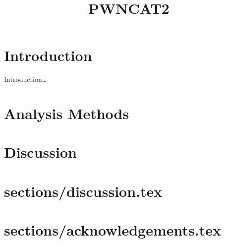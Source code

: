 \documentclass[12pt,preprint]{aastex}
\begin{document}
\title{PWNCAT2}





\begin{abstract}
  
\end{abstract}

\section{Introduction}


Introduction\dots

\section{Analysis Methods}


\section{Discussion}

\section{sections/discussion.tex}

\section{sections/acknowledgements.tex}




\end{document}
